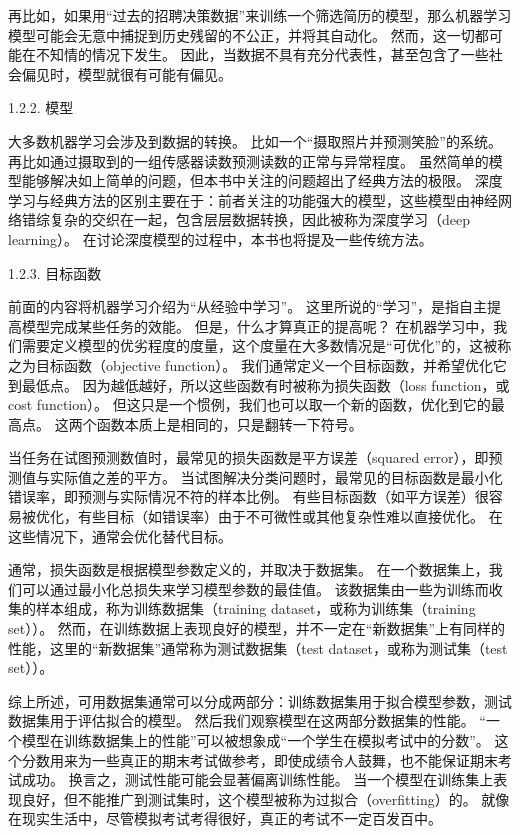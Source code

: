 再比如，如果用“过去的招聘决策数据”来训练一个筛选简历的模型，那么机器学习模型可能会无意中捕捉到历史残留的不公正，并将其自动化。 然而，这一切都可能在不知情的情况下发生。 因此，当数据不具有充分代表性，甚至包含了一些社会偏见时，模型就很有可能有偏见。

 1.2.2. 模型

大多数机器学习会涉及到数据的转换。 比如一个“摄取照片并预测笑脸”的系统。再比如通过摄取到的一组传感器读数预测读数的正常与异常程度。 虽然简单的模型能够解决如上简单的问题，但本书中关注的问题超出了经典方法的极限。 深度学习与经典方法的区别主要在于：前者关注的功能强大的模型，这些模型由神经网络错综复杂的交织在一起，包含层层数据转换，因此被称为深度学习（deep learning）。 在讨论深度模型的过程中，本书也将提及一些传统方法。

 1.2.3. 目标函数

前面的内容将机器学习介绍为“从经验中学习”。 这里所说的“学习”，是指自主提高模型完成某些任务的效能。 但是，什么才算真正的提高呢？ 在机器学习中，我们需要定义模型的优劣程度的度量，这个度量在大多数情况是“可优化”的，这被称之为目标函数（objective function）。 我们通常定义一个目标函数，并希望优化它到最低点。 因为越低越好，所以这些函数有时被称为损失函数（loss function，或cost function）。 但这只是一个惯例，我们也可以取一个新的函数，优化到它的最高点。 这两个函数本质上是相同的，只是翻转一下符号。

当任务在试图预测数值时，最常见的损失函数是平方误差（squared error），即预测值与实际值之差的平方。 当试图解决分类问题时，最常见的目标函数是最小化错误率，即预测与实际情况不符的样本比例。 有些目标函数（如平方误差）很容易被优化，有些目标（如错误率）由于不可微性或其他复杂性难以直接优化。 在这些情况下，通常会优化替代目标。

通常，损失函数是根据模型参数定义的，并取决于数据集。 在一个数据集上，我们可以通过最小化总损失来学习模型参数的最佳值。 该数据集由一些为训练而收集的样本组成，称为训练数据集（training dataset，或称为训练集（training set））。 然而，在训练数据上表现良好的模型，并不一定在“新数据集”上有同样的性能，这里的“新数据集”通常称为测试数据集（test dataset，或称为测试集（test set））。

综上所述，可用数据集通常可以分成两部分：训练数据集用于拟合模型参数，测试数据集用于评估拟合的模型。 然后我们观察模型在这两部分数据集的性能。 “一个模型在训练数据集上的性能”可以被想象成“一个学生在模拟考试中的分数”。 这个分数用来为一些真正的期末考试做参考，即使成绩令人鼓舞，也不能保证期末考试成功。 换言之，测试性能可能会显著偏离训练性能。 当一个模型在训练集上表现良好，但不能推广到测试集时，这个模型被称为过拟合（overfitting）的。 就像在现实生活中，尽管模拟考试考得很好，真正的考试不一定百发百中。

